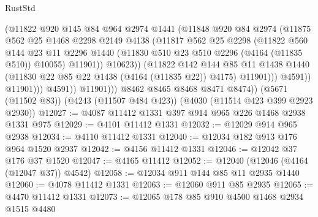 \begin{lexlean}{RustStd}
\begin{coremodule}
                              (@11822
                                @920
                                @145
                                @84
                                @964
                                @2974
                                @1441
                                (@11848
                                  @920
                                  @84
                                  @2974
                                  (@11875
                                    @562
                                    @25
                                    @1468
                                    @2298
                                    @2149
                                    @4138
                                    (@11817
                                      @562
                                      @25
                                      @2298
                                      (@11822
                                        @560
                                        @144
                                        @23
                                        @11
                                        @2296
                                        @1440
                                        (@11830 @510 @23 @510 @2296 (@4164 (@11835 @510)) @10055)
                                        @11901))
                                    @10623))
                                (@11822
                                  @142
                                  @144
                                  @85
                                  @11
                                  @1438
                                  @1440
                                  (@11830 @22 @85 @22 @1438 (@4164 (@11835 @22)) @4175)
                                  @11901)))
                            @4591))
                        @11901)))
                  @4591))
              @11901)))
        @8462
        @8465
        @8468
        @8471
        @8474))
    (@5671 (@11502 @83))
    (@4243 (@11507 @484 @423))
    (@4030 (@11514 @423 @399 @2923 @2930))
@12027 := @4087 @11412 @1331 @397 @914 @965 @226 @1468 @2938 @1331 @975
@12029 := @4101 @11412 @1331
@12032 := @12029 @914 @965 @2938
@12034 := @4110 @11412 @1331
@12040 := @12034 @182 @913 @176 @964 @1520 @2937
@12042 := @4156 @11412 @1331
@12046 := @12042 @37 @176 @37 @1520
@12047 := @4165 @11412
@12052 := @12040 (@12046 (@4164 (@12047 @37)) @4542)
@12058 := @12034 @911 @144 @85 @11 @2935 @1440
@12060 := @4078 @11412 @1331
@12063 := @12060 @911 @85 @2935
@12065 := @4470 @11412 @1331
@12073 := @12065 @178 @85 @910 @4500 @1468 @2934 @1515 @4480

\end{coremodule}
\end{lexlean}
